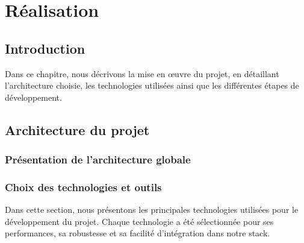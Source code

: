 \chapter{Réalisation}
\clearpage
\section{Introduction}
Dans ce chapitre, nous décrivons la mise en œuvre du projet, en détaillant l'architecture choisie, les technologies utilisées ainsi que les différentes étapes de développement.

\section{Architecture du projet}
\subsection{Présentation de l'architecture globale}

\subsection{Choix des technologies et outils}

Dans cette section, nous présentons les principales technologies utilisées pour le développement du projet. Chaque technologie a été sélectionnée pour ses performances, sa robustesse et sa facilité d’intégration dans notre stack.

\vspace{1cm} %



